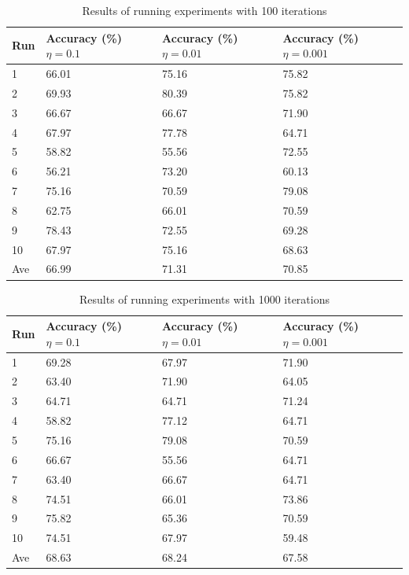 \documentclass[10pt,twocolumn,a4paper]{article}
\begin{document}
\begin{table}[h!]
\begin{center}
\begin{tabular}{ |p{2em}|p{5em}|p{5em}|p{5em}| } 
\hline
Run & Accuracy (\%) $\eta=0.1$ & Accuracy (\%) $\eta=0.01$ & Accuracy (\%) $\eta=0.001$\\
\hline
1 & 66.01 & 75.16 & 75.82 \\
2 & 69.93 & 80.39 & 75.82 \\
3 & 66.67 & 66.67 & 71.90 \\
4& 67.97 & 77.78 & 64.71 \\
5& 58.82 & 55.56 & 72.55 \\
6& 56.21 & 73.20 & 60.13 \\
7& 75.16 & 70.59 & 79.08 \\
8& 62.75 & 66.01 & 70.59 \\
9& 78.43 & 72.55 & 69.28 \\
10& 67.97 & 75.16 & 68.63 \\
\hline
Ave& 66.99 & 71.31 & 70.85 \\

\hline
\end{tabular}
\caption{Results of running experiments with 100 iterations}
\label{table:100iterations}
\end{center}
\end{table}

\begin{table}[h!]
\begin{center}
\begin{tabular}{ |p{2em}|p{5em}|p{5em}|p{5em}| } 
\hline
Run & Accuracy (\%) $\eta=0.1$ & Accuracy (\%) $\eta=0.01$ & Accuracy (\%) $\eta=0.001$\\
\hline
1& 69.28& 67.97& 71.90 \\
2& 63.40& 71.90& 64.05 \\
3& 64.71& 64.71& 71.24 \\
4& 58.82& 77.12& 64.71 \\
5& 75.16& 79.08& 70.59 \\
6& 66.67& 55.56& 64.71 \\
7& 63.40& 66.67& 64.71 \\
8& 74.51& 66.01& 73.86 \\
9& 75.82& 65.36& 70.59 \\
10& 74.51& 67.97& 59.48 \\
\hline
Ave& 68.63& 68.24& 67.58 \\

\hline
\end{tabular}
\caption{Results of running experiments with 1000 iterations}
\label{table:1000iterations}
\end{center}
\end{table}
\end{document}
